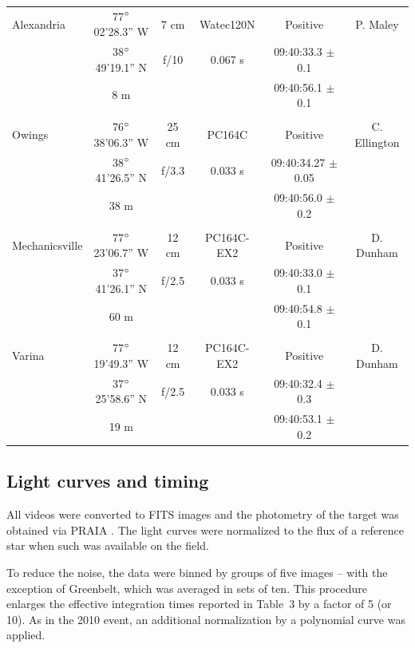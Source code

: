 \documentclass[useAMS,usenatbib]{mn2e}
\begin{document}
\begin{table}
\begin{minipage}{140mm}
\begin{tabular}{@{}lccccc}
 Alexandria & 77$\hbox{$^\circ$}$02'28.3'' W & 7 cm & Watec120N & Positive & P. Maley \\
  &38$\hbox{$^\circ$}$49'19.1'' N & f/10 &  0.067 s   & 09:40:33.3 $\pm$ 0.1 &   \\
            & 8 m       &   &     & 09:40:56.1  $\pm$ 0.1 &   \\
 & & & & & \\
 Owings & 76$\hbox{$^\circ$}$38'06.3'' W & 25 cm & PC164C  & Positive & C. Ellington \\
  &38$\hbox{$^\circ$}$41'26.5'' N & f/3.3 &  0.033 s & 09:40:34.27 $\pm$ 0.05 &   \\
            & 38 m                &       &     & 09:40:56.0  $\pm$ 0.2 &   \\
 & & & & & \\
 Mechanicsville & 77$\hbox{$^\circ$}$23'06.7'' W & 12 cm & PC164C-EX2 & Positive & D. Dunham \\
  &37$\hbox{$^\circ$}$41'26.1'' N & f/2.5 & 0.033 s    & 09:40:33.0 $\pm$ 0.1 &   \\
            & 60 m      &   &     & 09:40:54.8  $\pm$ 0.1 &   \\
 & & & & & \\
 Varina & 77$\hbox{$^\circ$}$19'49.3'' W & 12 cm & PC164C-EX2 & Positive & D. Dunham \\
  &37$\hbox{$^\circ$}$25'58.6'' N & f/2.5 &  0.033 s   & 09:40:32.4 $\pm$ 0.3 &   \\
            & 19 m      &   &     & 09:40:53.1  $\pm$ 0.2 &   \\

\hline
\end{tabular}
\end{minipage}
\end{table}

\subsection{Light curves and timing}

All videos were converted to FITS images and the photometry of the target was obtained via PRAIA \citep{2011gfun.conf...85A}. The light curves were normalized to the flux of a reference star when such was available on the field.

To reduce the noise, the data were binned by groups of five images -- with the exception of  Greenbelt, which was averaged in sets of ten. This procedure enlarges the effective integration times reported in Table~3 by a factor of 5 (or 10). As in the 2010 event, an additional normalization by a polynomial curve was applied.
\end{document}
